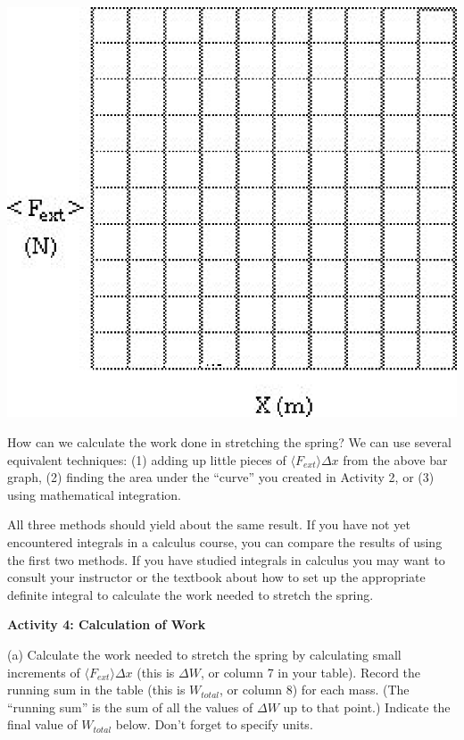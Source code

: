 \vspace{0.3cm}
{\par\centering \includegraphics{work_kinetic/work_kinetic_fig2.eps} \par}
\vspace{0.3cm}

How can we calculate the work done in stretching the spring? We can use several
equivalent techniques: (1) adding up little pieces of \( \langle F_{ext} 
\rangle \Delta x \) from the above bar graph,
(2) finding the area under the ``curve'' you created in Activity 2, or (3)
using mathematical integration.

All three methods should yield about the same result. If you have not yet encountered
integrals in a calculus course, you can compare the results of using the first
two methods. If you have studied integrals in calculus you may want to consult
your instructor or the textbook about how to set up the appropriate definite
integral to calculate the work needed to stretch the spring. 

\textbf{Activity 4: Calculation of Work }

(a) Calculate the work needed to stretch the spring by calculating small increments of \( \langle F_{ext} \rangle \Delta  x\) (this is \( \Delta W\), or column 7 in your table). Record the running sum in the table (this is \( W_{total} \), or column 8) for each mass. (The ``running sum'' is the sum of all the values of \( \Delta W\) up to that point.) Indicate the final value of \( W_{total} \) below. Don't forget to specify units.
\vspace{5mm}

